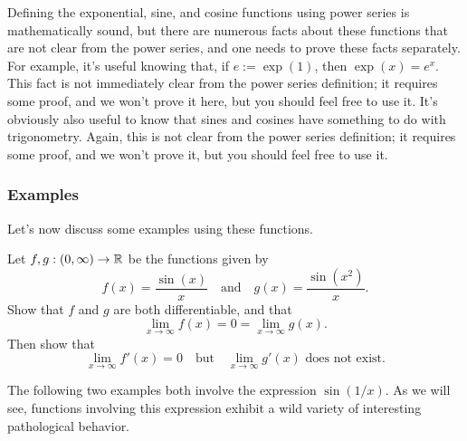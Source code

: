 \begin{remark}
	Defining the exponential, sine, and cosine functions using power series is mathematically sound, but there are numerous facts about these functions that are not clear from the power series, and one needs to prove these facts separately. For example, it's useful knowing that, if $e := \exp(1)$, then $\exp(x) = e^x$. This fact is not immediately clear from the power series definition; it requires some proof, and we won't prove it here, but you should feel free to use it. It's obviously also useful to know that sines and cosines have something to do with trigonometry. Again, this is not clear from the power series definition; it requires some proof, and we won't prove it, but you should feel free to use it. 
\end{remark}

\subsubsection*{Examples}

Let's now discuss some examples using these functions. 

\begin{exercise}
	Let $f, g : (0,\infty) \to \mathbb{R}$ be the functions given by 
	\[ f(x) = \frac{\sin(x)}{x} \quad \text{and} \quad g(x) = \frac{\sin(x^2)}{x}. \]
	Show that $f$ and $g$ are both differentiable, and that 
	\[ \lim_{x \to \infty} f(x) = 0 = \lim_{x \to \infty} g(x). \] Then show that 
	\[ \lim_{x \to \infty} f'(x) = 0 \quad \text{but} \quad \lim_{x \to \infty} g'(x) \text{ does not exist}. \]
\end{exercise}

The following two examples both involve the expression $\sin(1/x)$. As we will see, functions involving this expression exhibit a wild variety of interesting pathological behavior. 

